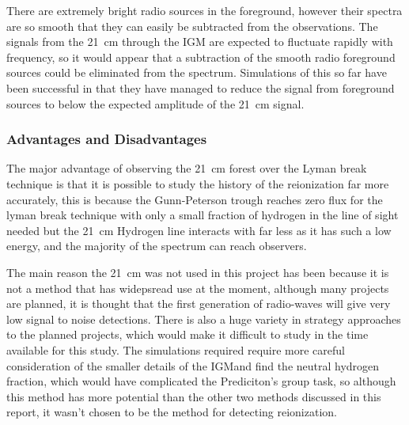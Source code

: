             There are extremely bright radio sources in the foreground, however their spectra are so smooth that they can easily be subtracted from the observations\cite{petrovic2011systematic}. The signals from the \SI{21}{\centi\metre} through the IGM are expected to fluctuate rapidly with frequency, so it would appear that a subtraction of the smooth radio foreground sources could be eliminated from the spectrum. Simulations of this so far have been successful in that they have managed to reduce the signal from foreground sources to below the expected amplitude of the \SI{21}{\centi\metre} signal\cite{liu2011method}.

        \subsubsection{Advantages and Disadvantages} %
    	\label{subsub:Advantages_disadvantages_21cm}
            The major advantage of observing the \SI{21}{\centi\metre} forest over the Lyman break technique is that it is possible to study the history of the reionization far more accurately, this is because the Gunn-Peterson trough reaches zero flux for the lyman break technique with only a small fraction of hydrogen in the line of sight needed  but the \SI{21}{\centi\metre} Hydrogen line interacts with far less as it has such a low energy, and the majority of the spectrum can reach observers.

            The main reason the \SI{21}{\centi\metre} was not used in this project has been because it is not a method that has widepsread use at the moment, although many projects are planned, it is thought that the first generation of radio-waves will give very low signal to noise detections. There is also a huge variety in strategy approaches to the planned projects\cite{parsons2012sensitivity}, which would make it difficult to study in the time available for this study. The simulations required require more careful consideration of the smaller details of the IGMand find the neutral hydrogen fraction\cite{mcgreer2011first}, which would have complicated the Prediciton's group task, so although this method has more potential than the other two methods discussed in this report, it wasn't chosen to be the method for detecting reionization.

